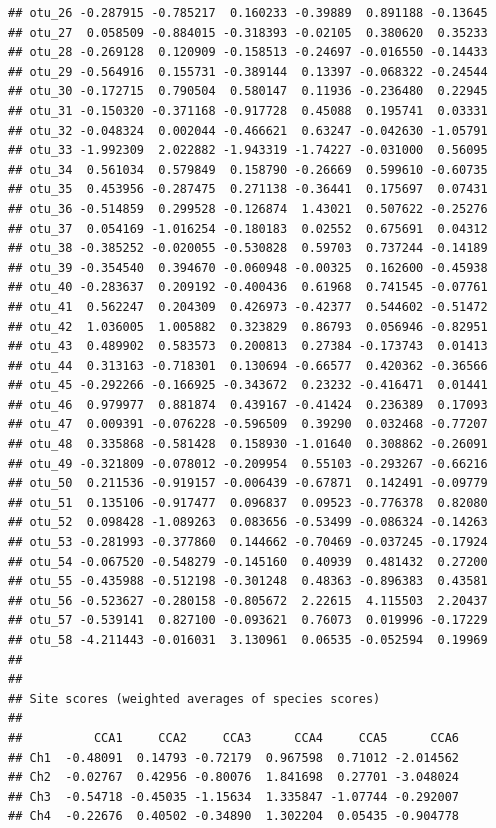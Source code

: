 \documentclass[
]{book}
\begin{document}
\begin{verbatim}
## otu_26 -0.287915 -0.785217  0.160233 -0.39889  0.891188 -0.13645
## otu_27  0.058509 -0.884015 -0.318393 -0.02105  0.380620  0.35233
## otu_28 -0.269128  0.120909 -0.158513 -0.24697 -0.016550 -0.14433
## otu_29 -0.564916  0.155731 -0.389144  0.13397 -0.068322 -0.24544
## otu_30 -0.172715  0.790504  0.580147  0.11936 -0.236480  0.22945
## otu_31 -0.150320 -0.371168 -0.917728  0.45088  0.195741  0.03331
## otu_32 -0.048324  0.002044 -0.466621  0.63247 -0.042630 -1.05791
## otu_33 -1.992309  2.022882 -1.943319 -1.74227 -0.031000  0.56095
## otu_34  0.561034  0.579849  0.158790 -0.26669  0.599610 -0.60735
## otu_35  0.453956 -0.287475  0.271138 -0.36441  0.175697  0.07431
## otu_36 -0.514859  0.299528 -0.126874  1.43021  0.507622 -0.25276
## otu_37  0.054169 -1.016254 -0.180183  0.02552  0.675691  0.04312
## otu_38 -0.385252 -0.020055 -0.530828  0.59703  0.737244 -0.14189
## otu_39 -0.354540  0.394670 -0.060948 -0.00325  0.162600 -0.45938
## otu_40 -0.283637  0.209192 -0.400436  0.61968  0.741545 -0.07761
## otu_41  0.562247  0.204309  0.426973 -0.42377  0.544602 -0.51472
## otu_42  1.036005  1.005882  0.323829  0.86793  0.056946 -0.82951
## otu_43  0.489902  0.583573  0.200813  0.27384 -0.173743  0.01413
## otu_44  0.313163 -0.718301  0.130694 -0.66577  0.420362 -0.36566
## otu_45 -0.292266 -0.166925 -0.343672  0.23232 -0.416471  0.01441
## otu_46  0.979977  0.881874  0.439167 -0.41424  0.236389  0.17093
## otu_47  0.009391 -0.076228 -0.596509  0.39290  0.032468 -0.77207
## otu_48  0.335868 -0.581428  0.158930 -1.01640  0.308862 -0.26091
## otu_49 -0.321809 -0.078012 -0.209954  0.55103 -0.293267 -0.66216
## otu_50  0.211536 -0.919157 -0.006439 -0.67871  0.142491 -0.09779
## otu_51  0.135106 -0.917477  0.096837  0.09523 -0.776378  0.82080
## otu_52  0.098428 -1.089263  0.083656 -0.53499 -0.086324 -0.14263
## otu_53 -0.281993 -0.377860  0.144662 -0.70469 -0.037245 -0.17924
## otu_54 -0.067520 -0.548279 -0.145160  0.40939  0.481432  0.27200
## otu_55 -0.435988 -0.512198 -0.301248  0.48363 -0.896383  0.43581
## otu_56 -0.523627 -0.280158 -0.805672  2.22615  4.115503  2.20437
## otu_57 -0.539141  0.827100 -0.093621  0.76073  0.019996 -0.17229
## otu_58 -4.211443 -0.016031  3.130961  0.06535 -0.052594  0.19969
## 
## 
## Site scores (weighted averages of species scores)
## 
##          CCA1     CCA2     CCA3      CCA4     CCA5      CCA6
## Ch1  -0.48091  0.14793 -0.72179  0.967598  0.71012 -2.014562
## Ch2  -0.02767  0.42956 -0.80076  1.841698  0.27701 -3.048024
## Ch3  -0.54718 -0.45035 -1.15634  1.335847 -1.07744 -0.292007
## Ch4  -0.22676  0.40502 -0.34890  1.302204  0.05435 -0.904778

\end{verbatim}
\end{document}

